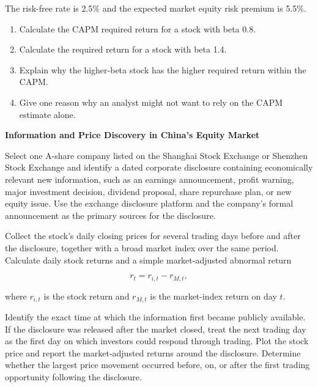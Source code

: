 \begin{enumerate}
The risk-free rate is 2.5\% and the expected market equity risk premium is 5.5\%.

\begin{enumerate}

\item Calculate the CAPM required return for a stock with beta 0.8.

\item Calculate the required return for a stock with beta 1.4.

\item Explain why the higher-beta stock has the higher required return within the CAPM.

\item Give one reason why an analyst might not want to rely on the CAPM estimate alone.

\end{enumerate}

\end{enumerate}



\textbf{Information and Price Discovery in China's Equity Market}

Select one A-share company listed on the Shanghai Stock Exchange or Shenzhen Stock Exchange and identify a dated corporate disclosure containing economically relevant new information, such as an earnings announcement, profit warning, major investment decision, dividend proposal, share repurchase plan, or new equity issue. Use the exchange disclosure platform and the company's formal announcement as the primary sources for the disclosure.

Collect the stock's daily closing prices for several trading days before and after the disclosure, together with a broad market index over the same period. Calculate daily stock returns and a simple market-adjusted abnormal return

\begin{equation*}
r_t=r_{i,t}-r_{M,t},
\end{equation*}

where \(r_{i,t}\) is the stock return and \(r_{M,t}\) is the market-index return on day \(t\).

Identify the exact time at which the information first became publicly available. If the disclosure was released after the market closed, treat the next trading day as the first day on which investors could respond through trading. Plot the stock price and report the market-adjusted returns around the disclosure. Determine whether the largest price movement occurred before, on, or after the first trading opportunity following the disclosure.


